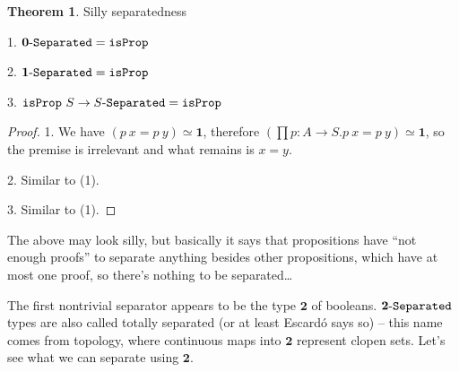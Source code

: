 \documentclass[11pt]{article}
\theoremstyle{definition}
\newtheorem{theorem}{Theorem}[section]
\newcommand{\text}[1]{\texttt{#1}}
\renewcommand{\(}{\left(}
\renewcommand{\)}{\right)}
\newcommand{\isProp}{\text{isProp}}
\newcommand{\apl}[2]{#1\ #2}
\newcommand{\hequiv}[2]{#1 \simeq #2}
\newcommand{\Empty}{\mathbf{0}}
\newcommand{\Unit}{\mathbf{1}}
\newcommand{\Bool}{\mathbf{2}}
\newcommand{\dprod}[2]{\prod #1.#2}
\begin{document}
\begin{theorem} Silly separatedness

1. $\Separated{\Empty} = \isProp$

2. $\Separated{\Unit} = \isProp$

3. $\apl{\isProp}{S} \to \Separated{S} = \isProp$

\end{theorem}
\begin{proof}
1. We have $\hequiv{(\apl{p}{x} = \apl{p}{y})}{\Unit}$, therefore $\hequiv{(\dprod{p : A \to S}{\apl{p}{x} = \apl{p}{y}})}{\Unit}$, so the premise is irrelevant and what remains is $x = y$.

2. Similar to (1).

3. Similar to (1).
\end{proof}

The above may look silly, but basically it says that propositions have ``not enough proofs'' to separate anything besides other propositions, which have at most one proof, so there's nothing to be separated\dots

The first nontrivial separator appears to be the type $\Bool$ of booleans. $\Separated{\Bool}$ types are also called totally separated (or at least Escard\'{o} says so) -- this name comes from topology, where continuous maps into $\Bool$ represent clopen sets. Let's see what we can separate using $\Bool$.
\end{document}

